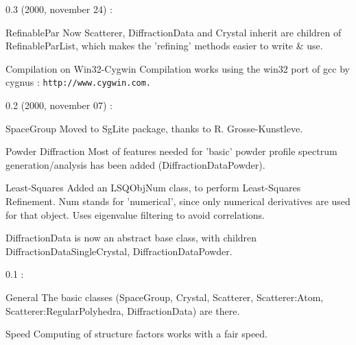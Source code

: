 \begin{DoxyParagraph}{0.3 (2000, november 24) : }
\begin{DoxyItemize}
\item RefinablePar Now Scatterer, DiffractionData and Crystal inherit are children of RefinableParList, which makes the 'refining' methods easier to write \& use. \item Compilation on Win32-\/Cygwin Compilation works using the win32 port of gcc by cygnus : {\tt http://www.cygwin.com.}\end{DoxyItemize}

\end{DoxyParagraph}
\begin{DoxyParagraph}{0.2 (2000, november 07) : }
\begin{DoxyItemize}
\item SpaceGroup Moved to SgLite package, thanks to R. Grosse-\/Kunstleve. \item Powder Diffraction Most of features needed for 'basic' powder profile spectrum generation/analysis has been added (DiffractionDataPowder). \item Least-\/Squares Added an LSQObjNum class, to perform Least-\/Squares Refinement. Num stands for 'numerical', since only numerical derivatives are used for that object. Uses eigenvalue filtering to avoid correlations. \item DiffractionData is now an abstract base class, with children DiffractionDataSingleCrystal, DiffractionDataPowder.\end{DoxyItemize}

\end{DoxyParagraph}
\begin{DoxyParagraph}{0.1 :}
\begin{DoxyItemize}
\item General The basic classes (SpaceGroup, Crystal, Scatterer, Scatterer:Atom, Scatterer:RegularPolyhedra, DiffractionData) are there. \item Speed Computing of structure factors works with a fair speed. \end{DoxyItemize}

\end{DoxyParagraph}
